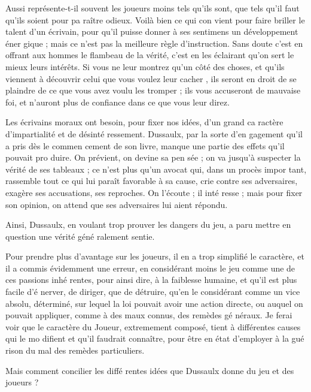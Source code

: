Aussi représente-t-il souvent les
joueurs moins tels qu'ils sont, que
tels qu'il faut qu'ils soient pour pa%
raître odieux. Voilà bien ce qui con%
vient pour faire briller le talent d'un
écrivain, pour qu'il puisse donner à
ses sentimens un développement éner%
gique ; mais ce n'est pas la meilleure
règle d'instruction. Sans doute c'est
en offrant aux hommes le flambeau
de la vérité, c'est en les éclairant qu'on
sert le mieux leurs intérêts. Si vous ne
leur montrez qu'un côté des choses,
et qu'ils viennent à découvrir celui
que vous voulez leur cacher , ils
seront en droit de se plaindre de ce
que vous avez voulu les tromper ; ils
vous accuseront de mauvaise foi, et
n'auront plus de confiance dans ce
que vous leur direz.

Les écrivains moraux ont besoin,
pour fixer nos idées, d'un grand ca%
ractère d'impartialité et de désinté%
ressement. Dussaulx, par la sorte d'en%
gagement qu'il a pris dès le commen%
cement de son livre, manque une
partie des effets qu'il pouvait pro%
duire. On prévient, on devine sa pen%
sée ; on va jusqu'à suspecter la vérité
de ses tableaux ; ce n'est plus qu'un
avocat qui, dans un procès impor%
tant, rassemble tout ce qui lui paraît
favorable à sa cause, crie contre ses
adversaires, exagère ses accusations,
ses reproches. On l'écoute ; il inté%
resse ; mais pour fixer son opinion,
on attend que ses adversaires lui aient
répondu.

Ainsi, Dussaulx, en voulant trop
prouver les dangers du jeu, a paru
mettre en question une vérité géné%
ralement sentie.

Pour prendre plus d'avantage sur
les joueurs, il en a trop simplifié le
caractère, et il a commis évidemment
une erreur, en considérant moins le
jeu comme une de ces passions inhé%
rentes, pour ainsi dire, à la faiblesse
humaine, et qu'il est plus facile d'é%
nerver, de diriger, que de détruire,
qu'en le considérant comme un vice
absolu, déterminé, sur lequel la loi
pouvait avoir une action directe, ou
auquel on pouvait appliquer, comme
à des maux connus, des remèdes gé%
néraux. Je ferai voir que le caractère
du Joueur, extremement composé,
tient à différentes causes qui le mo%
difient et qu'il faudrait connaître,
pour être en état d'employer à la gué%
rison du mal des remèdes particuliers.

Mais comment concilier les diffé%
rentes idées que Dussaulx donne du
jeu et des joueurs ?


